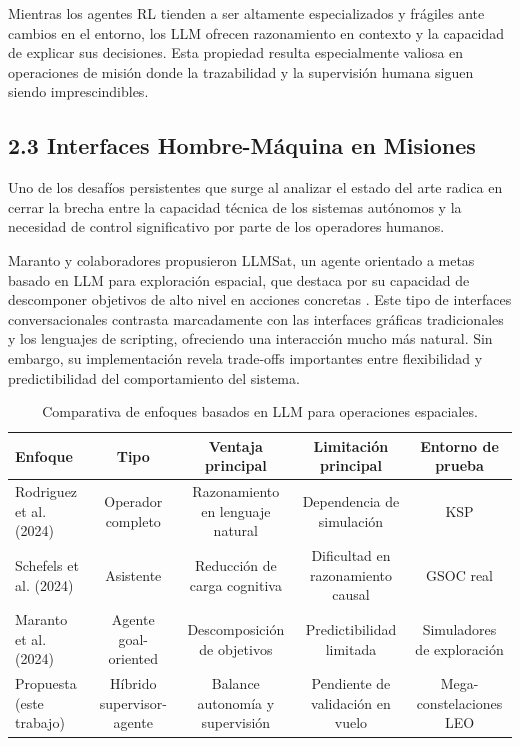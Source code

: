 Mientras los agentes RL tienden a ser altamente especializados y frágiles ante cambios en el entorno, los LLM ofrecen razonamiento en contexto y la capacidad de explicar sus decisiones. Esta propiedad resulta especialmente valiosa en operaciones de misión donde la trazabilidad y la supervisión humana siguen siendo imprescindibles.

\subsection{2.3 Interfaces Hombre-Máquina en Misiones}

Uno de los desafíos persistentes que surge al analizar el estado del arte radica en cerrar la brecha entre la capacidad técnica de los sistemas autónomos y la necesidad de control significativo por parte de los operadores humanos.

Maranto y colaboradores propusieron LLMSat, un agente orientado a metas basado en LLM para exploración espacial, que destaca por su capacidad de descomponer objetivos de alto nivel en acciones concretas \cite{maranto2024llmsat}. Este tipo de interfaces conversacionales contrasta marcadamente con las interfaces gráficas tradicionales y los lenguajes de scripting, ofreciendo una interacción mucho más natural. Sin embargo, su implementación revela trade-offs importantes entre flexibilidad y predictibilidad del comportamiento del sistema.

\begin{table}[t]
\centering
\caption{Comparativa de enfoques basados en LLM para operaciones espaciales.}
\label{tab:comparativa_llm}
\begin{tabular}{lcccc}
\toprule
Enfoque & Tipo & Ventaja principal & Limitación principal & Entorno de prueba \\
\midrule
Rodriguez et al. (2024) & Operador completo & Razonamiento en lenguaje natural & Dependencia de simulación & KSP \\
Schefels et al. (2024) & Asistente & Reducción de carga cognitiva & Dificultad en razonamiento causal & GSOC real \\
Maranto et al. (2024) & Agente goal-oriented & Descomposición de objetivos & Predictibilidad limitada & Simuladores de exploración \\
Propuesta (este trabajo) & Híbrido supervisor-agente & Balance autonomía y supervisión & Pendiente de validación en vuelo & Mega-constelaciones LEO \\
\bottomrule
\end{tabular}
\end{table}